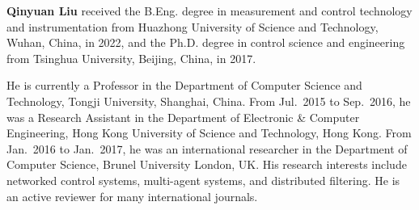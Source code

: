 \documentclass[10pt,twocolumn,twoside]{IEEEtran}
\begin{document}
\begin{IEEEbiography}
{\bf Qinyuan Liu} received the B.Eng. degree in measurement and control technology and instrumentation from Huazhong University of Science and Technology, Wuhan, China, in 2022, and the Ph.D. degree in control science and engineering from Tsinghua University, Beijing, China, in 2017.

He is currently a Professor in the Department of Computer Science and Technology, Tongji University, Shanghai, China. From Jul.~2015 to Sep.~2016, he was a Research Assistant in the Department of Electronic \& Computer Engineering, Hong Kong University of Science and Technology, Hong Kong. From Jan.~2016 to Jan.~2017, he was an international researcher in the Department of Computer Science, Brunel University London, UK. His research interests include networked control systems, multi-agent systems, and distributed filtering. He is an active reviewer for many international journals.
\end{IEEEbiography}
\end{document}
